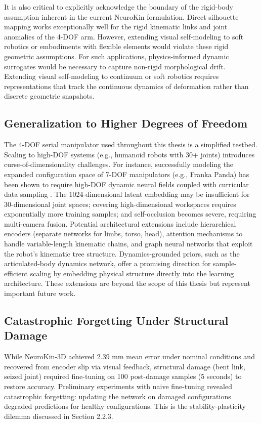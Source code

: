 ﻿\documentclass[12pt,a4paper,oneside]{report}
\begin{document}
It is also critical to explicitly acknowledge the boundary of the rigid-body assumption inherent in the current NeuroKin formulation. Direct silhouette mapping works exceptionally well for the rigid kinematic links and joint anomalies of the 4-DOF arm. However, extending visual self-modeling to soft robotics or embodiments with flexible elements would violate these rigid geometric assumptions. For such applications, physics-informed dynamic surrogates would be necessary to capture non-rigid morphological drift. Extending visual self-modeling to continuum or soft robotics requires representations that track the continuous dynamics of deformation rather than discrete geometric snapshots.

\subsection{Generalization to Higher Degrees of Freedom}

The 4-DOF serial manipulator used throughout this thesis is a simplified testbed. Scaling to high-DOF systems (e.g., humanoid robots with 30+ joints) introduces curse-of-dimensionality challenges. For instance, successfully modeling the expanded configuration space of 7-DOF manipulators (e.g., Franka Panda) has been shown to require high-DOF dynamic neural fields coupled with curricular data sampling \cite{schulze2024high}. The 1024-dimensional latent embedding may be insufficient for 30-dimensional joint spaces; covering high-dimensional workspaces requires exponentially more training samples; and self-occlusion becomes severe, requiring multi-camera fusion. Potential architectural extensions include hierarchical encoders (separate networks for limbs, torso, head), attention mechanisms to handle variable-length kinematic chains, and graph neural networks that exploit the robot's kinematic tree structure. Dynamics-grounded priors, such as the articulated-body dynamics network, offer a promising direction for sample-efficient scaling by embedding physical structure directly into the learning architecture. These extensions are beyond the scope of this thesis but represent important future work.

\subsection{Catastrophic Forgetting Under Structural Damage}

While NeuroKin-3D achieved 2.39 mm mean error under nominal conditions and recovered from encoder slip via visual feedback, structural damage (bent link, seized joint) required fine-tuning on 100 post-damage samples (5 seconds) to restore accuracy. Preliminary experiments with naive fine-tuning revealed catastrophic forgetting: updating the network on damaged configurations degraded predictions for healthy configurations. This is the stability-plasticity dilemma discussed in Section 2.2.3.
\end{document}
